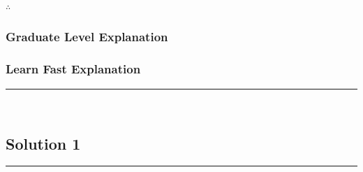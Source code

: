 \documentclass{article}
\begin{document}
\subsubsection*{\normalfont}{$\therefore$ }

\subsubsection*{Graduate Level Explanation}

\subsubsection*{Learn Fast Explanation}

\noindent\rule{\textwidth}{0.4pt}\\

\newpage

\subsection*{Solution 1}
\noindent\rule{\textwidth}{0.4pt}\\
\end{document}
